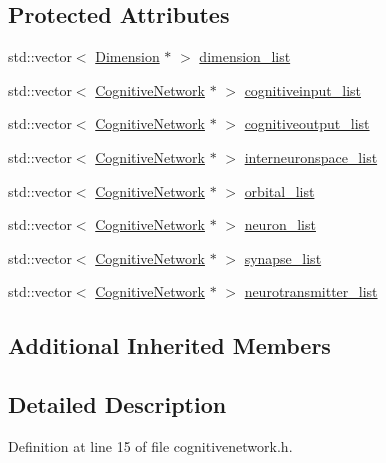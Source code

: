 \subsection*{Protected Attributes}
\begin{DoxyCompactItemize}
\item 
std\+::vector$<$ \hyperlink{class_dimension}{Dimension} $\ast$ $>$ \hyperlink{class_cognitive_network_a79f0541fde6dd50f8e87f3f46d849b95}{dimension\+\_\+list}
\item 
std\+::vector$<$ \hyperlink{class_cognitive_network}{Cognitive\+Network} $\ast$ $>$ \hyperlink{class_cognitive_network_a5a46cefb188858fdc023df3abbac0a47}{cognitiveinput\+\_\+list}
\item 
std\+::vector$<$ \hyperlink{class_cognitive_network}{Cognitive\+Network} $\ast$ $>$ \hyperlink{class_cognitive_network_a7a57ad82736c0d8b03e7607b5c603b00}{cognitiveoutput\+\_\+list}
\item 
std\+::vector$<$ \hyperlink{class_cognitive_network}{Cognitive\+Network} $\ast$ $>$ \hyperlink{class_cognitive_network_aaf69f6e0cc0084eb748ef1540c773f85}{interneuronspace\+\_\+list}
\item 
std\+::vector$<$ \hyperlink{class_cognitive_network}{Cognitive\+Network} $\ast$ $>$ \hyperlink{class_cognitive_network_a263efd10857d5507c0e889e48f7329fe}{orbital\+\_\+list}
\item 
std\+::vector$<$ \hyperlink{class_cognitive_network}{Cognitive\+Network} $\ast$ $>$ \hyperlink{class_cognitive_network_abbb9ff97e1b9cd61602d95f44c30132e}{neuron\+\_\+list}
\item 
std\+::vector$<$ \hyperlink{class_cognitive_network}{Cognitive\+Network} $\ast$ $>$ \hyperlink{class_cognitive_network_a9218de9d63b10b313df289d1312c81e0}{synapse\+\_\+list}
\item 
std\+::vector$<$ \hyperlink{class_cognitive_network}{Cognitive\+Network} $\ast$ $>$ \hyperlink{class_cognitive_network_a7018bee3dbf538c3d0c81a64aa002ab8}{neurotransmitter\+\_\+list}
\end{DoxyCompactItemize}
\subsection*{Additional Inherited Members}


\subsection{Detailed Description}


Definition at line 15 of file cognitivenetwork.\+h.



